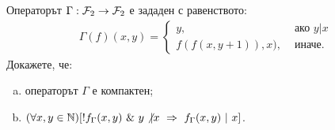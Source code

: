 

\begin{problem}
  Операторът $\Gamma:\mathcal{F}_2 \to \mathcal{F}_2$ е зададен с равенството:
  \begin{align*}
    \Gamma(f)(x,y) = 
    \begin{cases}
      y, & \text{ ако } y\vert x\\
      f(f(x,y+1)), x), & \text{ иначе}.
    \end{cases}
  \end{align*}
  Докажете, че:
  \begin{enumerate}[a)]
  \item 
    операторът $\Gamma$ е компактен;
  \item
    $(\forall x,y\in\Nat)[!f_\Gamma(x,y)\ \&\ y\not| x\ \Rightarrow\ f_\Gamma(x,y)\ \vert\ x]$.
  \end{enumerate}  
\end{problem}

